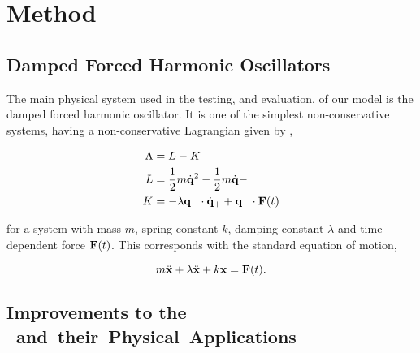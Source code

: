 \section{Method}
%

\subsection{Damped Forced Harmonic Oscillators}
\label{sec:eg-sys}

The main physical system used in the testing, and evaluation, of our model is the damped forced harmonic oscillator. It is one of the simplest non-conservative systems, having a non-conservative Lagrangian given by \cite{galleyPrincipleStationaryNonconservative2014},

\begin{equation}
\label{eq:dho-sys-embedding}
\begin{aligned}
  \Lambda &= L - K \\
  L &= \frac12 m\dot{\vb{q}}^2 - \frac12 m\dot{\vb{q}} -  \\
  K &= - \lambda\vb{q}_- \cdot \dot {\vb{q}}_+ + \vb{q}_- \cdot \vb{F}(t)
\end{aligned}
\end{equation}

for a system with mass $m$, spring constant $k$, damping constant $\lambda$ and time dependent force $\vb{F}(t)$. This corresponds with the standard equation of motion,

\begin{equation}
  m \ddot{\vb x} + \lambda \ddot{\vb x} + k \vb x = \vb F(t).
\end{equation}

\subsection{Improvements to the \SI{} and their Physical Applications}

